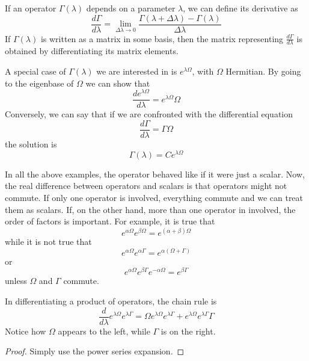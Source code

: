 \documentclass[11pt,fleqn]{book} %
\begin{document}
\begin{definition}
    If an operator $\Gamma(\lambda)$ depends on a parameter $\lambda$, we can define its derivative as
    \begin{equation*}
        \frac{d\Gamma}{d\lambda} = \lim_{\Delta\lambda\to 0}\frac{\Gamma(\lambda+\Delta\lambda) - \Gamma(\lambda)}{\Delta\lambda}
    \end{equation*}
    If $\Gamma(\lambda)$ is written as a matrix in some basis, then the matrix representing $\frac{d\Gamma}{d\lambda}$ is obtained
    by differentiating its matrix elements.
\end{definition}
A special case of $\Gamma(\lambda)$ we are interested in is $e^{\lambda\Omega}$, with $\Omega$ Hermitian. By going to the eigenbase of $\Omega$
we can show that
\begin{equation*}
    \frac{d e^{\lambda\Omega}}{d\lambda} = e^{\lambda\Omega}\Omega
\end{equation*}
Conversely, we can say that if we are confronted with the differential equation
\begin{equation*}
    \frac{d\Gamma}{d\lambda} = \Gamma\Omega
\end{equation*}
the solution is 
\begin{equation*}
    \Gamma(\lambda) = C e^{\lambda\Omega}
\end{equation*}

\begin{remark}
    In all the above examples, the operator behaved like if it were just a scalar. Now, the real difference between operators and scalars is that 
    operators might not commute. If only one operator is involved, everything commute and we can treat them as scalars. If, on the other hand, more
    than one operator in involved, the order of factors is important. For example, it is true that 
    \begin{equation*}
        e^{\alpha\Omega}e^{\beta\Omega} = e^{(\alpha+\beta)\Omega}
    \end{equation*}
    while it is not true that 
    \begin{equation*}
        e^{\alpha\Omega}e^{\alpha\Gamma} = e^{\alpha(\Omega+\Gamma)}
    \end{equation*}
    or
    \begin{equation*}
        e^{\alpha\Omega}e^{\beta\Gamma}e^{-\alpha\Omega} = e^{\beta\Gamma}
    \end{equation*}
    unless $\Omega$ and $\Gamma$ commute.
\end{remark}
\begin{theorem}
    In differentiating a product of operators, the chain rule is
    \begin{equation*}
        \frac{d}{d\lambda}e^{\lambda\Omega}e^{\lambda\Gamma} = \Omega e^{\lambda\Omega}e^{\lambda\Gamma} + e^{\lambda\Omega}e^{\lambda\Gamma}\Gamma
    \end{equation*}
    Notice how $\Omega$ appears to the left, while $\Gamma$ is on the right.
\end{theorem}
\begin{proof}
    Simply use the power series expansion.
\end{proof}
\end{document}
